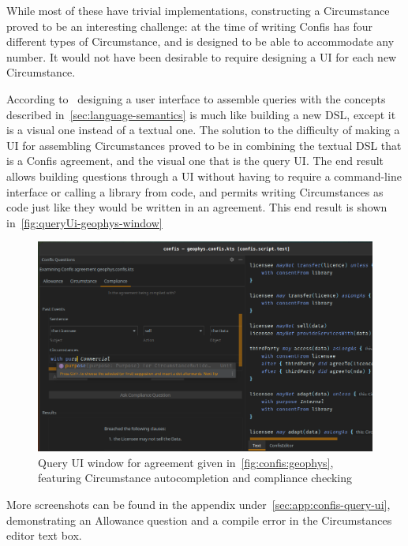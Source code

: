 While most of these have trivial implementations, constructing a Circumstance proved to be an interesting challenge: at the time of writing Confis has four different types of Circumstance, and is designed to be able to accommodate any number.
It would not have been desirable to require designing a UI for each new Circumstance.

According to~\cite{fowlerLangWorkbench} designing a user interface to assemble queries with the concepts described in~\autoref{sec:language-semantics} is much like building a new DSL, except it is a visual one instead of a textual one.
The solution to the difficulty of making a UI for assembling Circumstances proved to be in combining the textual DSL that is a Confis agreement, and the visual one that is the query UI\@.
The end result allows building questions through a UI without having to require a command-line interface or calling a library from code, and permits writing Circumstances as code just like they would be written in an agreement.
This end result is shown in~\autoref{fig:queryUi-geophys-window}

\begin{figure}[h]
    \centering
    \includegraphics[width=\textwidth]{figures/geophys.confis.queryUI}
    \caption[Query UI window for Geophysical Libray License]{Query UI window for agreement given in~\autoref{fig:confis:geophys}, featuring Circumstance autocompletion and compliance checking}
    \label{fig:queryUi-geophys-window}
\end{figure}

More screenshots can be found in the appendix under~\autoref{sec:app:confis-query-ui}, demonstrating an Allowance question and a compile error in the Circumstances editor text box.


